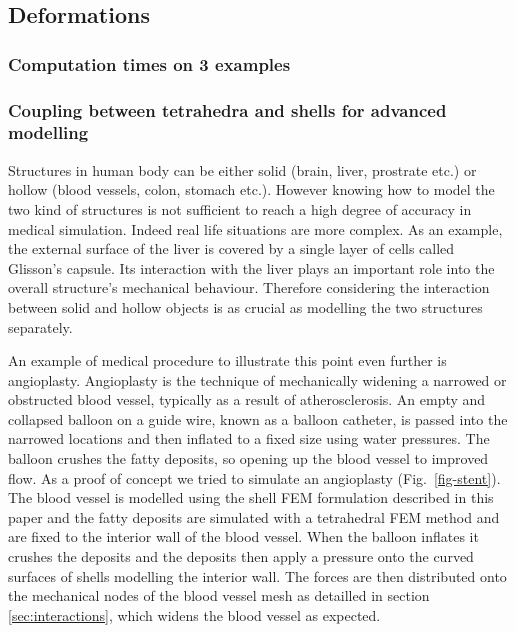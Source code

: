 \documentclass{llncs}
\begin{document}
\subsection{Deformations}

\subsubsection{Computation times on 3 examples}

\subsubsection{Coupling between tetrahedra and shells for advanced modelling}

Structures in human body can be either solid (brain, liver, prostrate etc.) or hollow (blood vessels, colon, stomach etc.). However knowing how to model the two kind of structures is not sufficient to reach a high degree of accuracy in medical simulation. Indeed real life situations are more complex. As an example, the external surface of the liver is covered by a single layer of cells called Glisson's capsule. Its interaction with the liver plays an important role into the overall structure's mechanical behaviour. Therefore considering the interaction between solid and hollow objects is as crucial as modelling the two structures separately. 

An example of medical procedure to illustrate this point even further is angioplasty. Angioplasty is the technique of mechanically widening a narrowed or obstructed blood vessel, typically as a result of atherosclerosis. An empty and collapsed balloon on a guide wire, known as a balloon catheter, is passed into the narrowed locations and then inflated to a fixed size using water pressures. The balloon crushes the fatty deposits, so opening up the blood vessel to improved flow. As a proof of concept we tried to simulate an angioplasty (Fig.~\ref{fig-stent}). The blood vessel is modelled using the shell FEM formulation described in this paper and the fatty deposits are simulated with a tetrahedral FEM method and are fixed to the interior wall of the blood vessel. When the balloon inflates it crushes the deposits and the deposits then apply a pressure onto the curved surfaces of shells modelling the interior wall. The forces are then distributed onto the mechanical nodes of the blood vessel mesh as detailled in section \ref{sec:interactions}, which widens the blood vessel as expected. 
\end{document}
